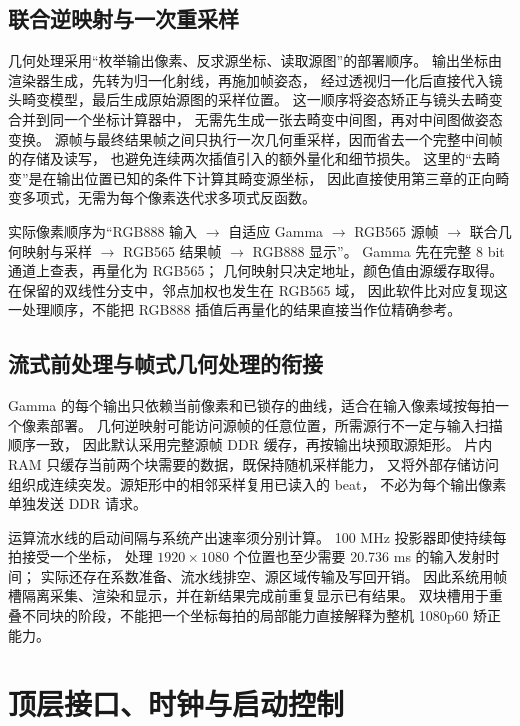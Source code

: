 \subsection{联合逆映射与一次重采样}
几何处理采用“枚举输出像素、反求源坐标、读取源图”的部署顺序。
输出坐标由渲染器生成，先转为归一化射线，再施加帧姿态，
经过透视归一化后直接代入镜头畸变模型，最后生成原始源图的采样位置。
这一顺序将姿态矫正与镜头去畸变合并到同一个坐标计算器中，
无需先生成一张去畸变中间图，再对中间图做姿态变换。
源帧与最终结果帧之间只执行一次几何重采样，因而省去一个完整中间帧的存储及读写，
也避免连续两次插值引入的额外量化和细节损失。
这里的“去畸变”是在输出位置已知的条件下计算其畸变源坐标，
因此直接使用第三章的正向畸变多项式，无需为每个像素迭代求多项式反函数。

实际像素顺序为“RGB888 输入 $\rightarrow$ 自适应 Gamma $\rightarrow$ RGB565 源帧
$\rightarrow$ 联合几何映射与采样 $\rightarrow$ RGB565 结果帧 $\rightarrow$ RGB888 显示”。
Gamma 先在完整 8 bit 通道上查表，再量化为 RGB565；
几何映射只决定地址，颜色值由源缓存取得。
在保留的双线性分支中，邻点加权也发生在 RGB565 域，
因此软件比对应复现这一处理顺序，不能把 RGB888 插值后再量化的结果直接当作位精确参考。

\subsection{流式前处理与帧式几何处理的衔接}
Gamma 的每个输出只依赖当前像素和已锁存的曲线，适合在输入像素域按每拍一个像素部署。
几何逆映射可能访问源帧的任意位置，所需源行不一定与输入扫描顺序一致，
因此默认采用完整源帧 DDR 缓存，再按输出块预取源矩形。
片内 RAM 只缓存当前两个块需要的数据，既保持随机采样能力，
又将外部存储访问组织成连续突发。源矩形中的相邻采样复用已读入的 beat，
不必为每个输出像素单独发送 DDR 请求。

运算流水线的启动间隔与系统产出速率须分别计算。
100 MHz 投影器即使持续每拍接受一个坐标，
处理 $1920\times1080$ 个位置也至少需要 20.736 ms 的输入发射时间；
实际还存在系数准备、流水线排空、源区域传输及写回开销。
因此系统用帧槽隔离采集、渲染和显示，并在新结果完成前重复显示已有结果。
双块槽用于重叠不同块的阶段，不能把一个坐标每拍的局部能力直接解释为整机 1080p60 矫正能力。

\section{顶层接口、时钟与启动控制}
